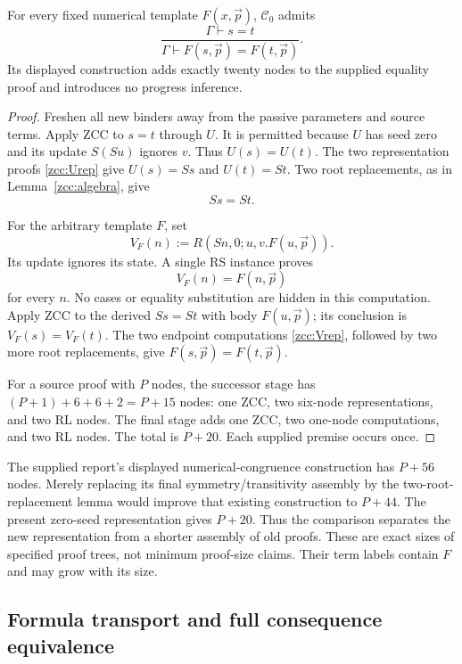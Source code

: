 \begin{theorem}\label{zcc:numerical}
For every fixed numerical template $F(x,\vec p)$, $\mathcal C_0$ admits
\[
 \frac{\Gamma\vdash s=t}
      {\Gamma\vdash F(s,\vec p)=F(t,\vec p)}.
\]
Its displayed construction adds exactly twenty nodes to the supplied
equality proof and introduces no progress inference.
\end{theorem}
\begin{proof}
Freshen all new binders away from the passive parameters and source terms.
Apply ZCC to $s=t$ through $U$. It is permitted because $U$ has seed zero
and its update $S(Su)$ ignores $v$. Thus $U(s)=U(t)$. The two representation
proofs \eqref{zcc:Urep} give $U(s)=Ss$ and $U(t)=St$.
Two root replacements, as in Lemma~\ref{zcc:algebra}, give
\[
                              Ss=St.
 \label{zcc:successor}
\]

For the arbitrary template $F$, set
\[
                  V_F(n):=R(Sn,0;u,v.F(u,\vec p)).
 \label{zcc:V}
\]
Its update ignores its state. A single RS instance proves
\[
                         V_F(n)=F(n,\vec p)
 \tag{V}\label{zcc:Vrep}
\]
for every $n$. No cases or equality substitution are hidden in this
computation. Apply ZCC to the derived $Ss=St$ with body $F(u,\vec p)$;
its conclusion is $V_F(s)=V_F(t)$. The two endpoint computations
\eqref{zcc:Vrep}, followed by two more root replacements, give
$F(s,\vec p)=F(t,\vec p)$.

For a source proof with $P$ nodes, the successor stage has
$(P+1)+6+6+2=P+15$ nodes: one ZCC, two six-node representations, and two
RL nodes. The final stage adds one ZCC, two one-node computations, and
two RL nodes. The total is $P+20$. Each supplied premise occurs once.
\end{proof}

The supplied report's displayed numerical-congruence construction has
$P+56$ nodes. Merely replacing its final symmetry/transitivity assembly
by the two-root-replacement lemma would improve that existing construction
to $P+44$. The present zero-seed representation gives $P+20$. Thus the
comparison separates the new representation from a shorter assembly of
old proofs. These are exact sizes of specified proof trees, not minimum
proof-size claims. Their term labels contain $F$ and may grow with its size.

\subsection{Formula transport and full consequence equivalence}

